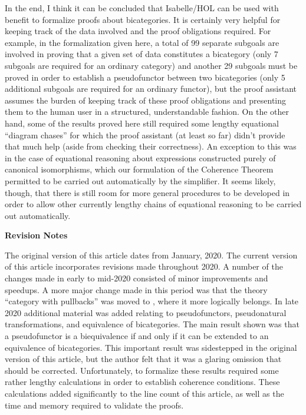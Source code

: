 \documentclass[11pt,notitlepage,a4paper]{report}
\begin{document}
In the end, I think it can be concluded that Isabelle/HOL can be used with benefit to formalize
proofs about bicategories.  It is certainly very helpful for keeping track of the data
involved and the proof obligations required.  For example, in the formalization given here,
a total of 99 separate subgoals are involved in proving that a given set of data constitutes
a bicategory (only 7 subgoals are required for an ordinary category)
and another 29 subgoals must be proved in order to establish a pseudofunctor between two
bicategories (only 5 additional subgoals are required for an ordinary functor),
but the proof assistant assumes the burden of keeping track of these proof obligations and
presenting them to the human user in a structured, understandable fashion.
On the other hand, some of the results proved here still required some lengthy equational
``diagram chases'' for which the proof assistant (at least so far) didn't provide that much help
(aside from checking their correctness).
An exception to this was in the case of equational reasoning about expressions constructed
purely of canonical isomorphisms, which our formulation of the Coherence Theorem permitted
to be carried out automatically by the simplifier.
It seems likely, though, that there is still room for more general procedures to be developed
in order to allow other currently lengthy chains of equational reasoning to be carried out
automatically.

\medskip\par\noindent
{\bf Revision Notes}

The original version of this article dates from January, 2020.
The current version of this article incorporates revisions made throughout 2020.
A number of the changes made in early to mid-2020 consisted of minor improvements
and speedups.  A more major change made in this period was that the theory
``category with pullbacks'' was moved to \cite{Category3-AFP}, where it more
logically belongs.
In late 2020 additional material was added relating to pseudofunctors,
pseudonatural transformations, and equivalence of bicategories.
The main result shown was that a pseudofunctor is a biequivalence if and only
if it can be extended to an equivalence of bicategories.
This important result was sidestepped in the original version of this article,
but the author felt that it was a glaring omission that should be corrected.
Unfortunately, to formalize these results required some rather lengthy calculations
in order to establish coherence conditions.  These calculations added significantly
to the line count of this article, as well as the time and memory required to
validate the proofs.
\end{document}
